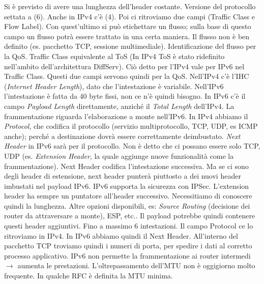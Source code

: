 Si è previsto di avere una lunghezza dell'header costante. Versione del protocollo settata a (6). Anche in IPv4 c'è (4). Poi ci ritroviamo due campi (Traffic Class e Flow Label). Con quest'ultimo si può etichettare un flusso; sulla base di questo campo un flusso potrà essere trattato in una certa maniera. Il flusso non è ben definito (es. pacchetto TCP, sessione multimediale). Identificazione del flusso per la QoS. Traffic Class equivalente al ToS (In IPv4 ToS è stato ridefinito nell'ambito dell'architettura DiffServ). Ciò detto per l'IPv4 vale per IPv6 nel Traffic Class. Questi due campi servono quindi per la QoS. Nell'IPv4 c'è l'IHC (\textit{Internet Header Length}), dato che l'intestazione è variabile. Nell'IPv6 l'intestazione è fatta da 40 byte fissi, non ce n'è quindi bisogno. In IPv6 c'è il campo \textit{Payload Length} direttamente, anziché il \textit{Total Length} dell'IPv4. La frammentazione riguarda l'elaborazione a monte nell'IPv6. In IPv4 abbiamo il \textit{Protocol}, che codifica il protocollo (servizio multiprotocollo, TCP, UDP, es ICMP anche); perché a destinazione dovrà essere correttamente deimbustato. \textit{Next Header} in IPv6 sarà per il protocollo. Non è detto che ci possano essere solo TCP, UDP (es. \textit{Extension Header}, la quale aggiunge nuove funzionalità come la frammentazione). Next Header codifica l'intestazione successiva. Ma se ci sono degli header di estensione, next header punterà piuttosto a dei nuovi header imbustati nel payload IPv6. IPv6 supporta la sicurezza con IPSec. L'extension header ha sempre un puntatore all'header successivo. Necessitiamo di conoscere quindi la lunghezza. Altre opzioni disponibili, es: \textit{Source Routing} (decisione dei router da attraversare a monte), ESP, etc.. Il payload potrebbe quindi contenere questi header aggiuntivi. Fino a massimo 6 intestazioni. Il campo Protocol ce lo ritroviamo in IPv4. In IPv6 abbiamo quindi il Next Header. All'interno del pacchetto TCP troviamo quindi i numeri di porta, per spedire i dati al corretto processo applicativo. IPv6 non permette la frammentazione ai router intermedi $\rightarrow$ aumenta le prestazioni. L'oltrepassamento dell'MTU non è oggigiorno molto frequente. In qualche RFC è definita la MTU minima.

